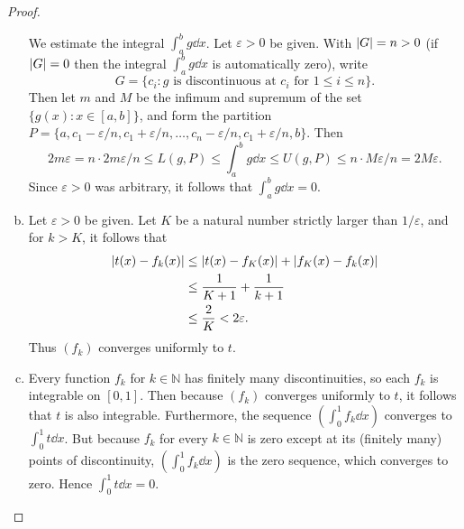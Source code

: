 \documentclass[12pt]{amsart}
\begin{document}
\begin{proof}
\begin{enumerate}[(a)]
    We estimate the integral $\int_a^b g\dd{x}$. Let $\varepsilon > 0$ be given. With $\abs{G} = n > 0$ (if $\abs{G} = 0$ then the integral $\int_a^b g\dd{x}$ is automatically zero), write \[G = \{c_i\colon \text{$g$ is discontinuous at $c_i$ for $1\leq i \leq n$}\}.\] Then let $m$ and $M$ be the infimum and supremum of the set $\{g(x) \colon x\in [a,b]\}$, and form the partition $P = \{a, c_1-\varepsilon/n, c_1+\varepsilon/n, \dots, c_n-\varepsilon/n, c_1+\varepsilon/n, b \}$. Then \[2m\varepsilon = n\cdot 2m\varepsilon/n \leq L(g,P)\leq \int_a^b g \dd{x} \leq U(g,P) \leq n\cdot M\varepsilon/n = 2M\varepsilon.\] 
    Since $\varepsilon> 0$ was arbitrary, it follows that $\int_a^b g\dd{x} = 0$.
    \item Let $\varepsilon> 0$ be given. Let $K$ be a natural number strictly larger than $1/\varepsilon$, and for $k> K$, it follows that \begin{align*}
        \abs{t(x) - f_k(x)} &\leq \abs{t(x) - f_K(x)} + \abs{f_K(x) - f_k(x)}\\
        &\leq \frac{1}{K+1} + \frac{1}{k+1}\\
        &\leq \frac{2}{K} < 2\varepsilon.
    \end{align*} Thus $(f_k)$ converges uniformly to $t$.
    \item Every function $f_k$ for $k\in \mathbb{N}$ has finitely many discontinuities, so each $f_k$ is integrable on $[0,1]$. Then because $(f_k)$ converges uniformly to $t$, it follows that $t$ is also integrable. Furthermore, the sequence $(\int_0^1 f_k\dd{x})$ converges to $\int_0^1 t\dd{x}$. But because $f_k$ for every $k\in \mathbb{N}$ is zero except at its (finitely many) points of discontinuity, $(\int_0^1 f_k\dd{x})$ is the zero sequence, which converges to zero. Hence $\int_0^1 t\dd{x} = 0$.
\end{enumerate}
\end{proof}
\end{document}
